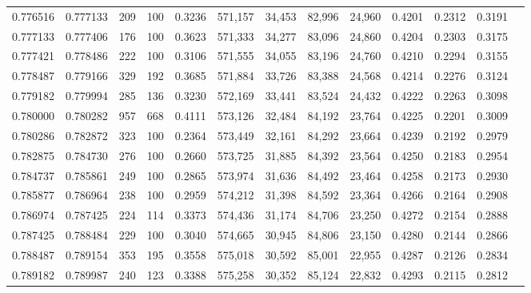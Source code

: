 \begin{tabular}{rrrrrrrrrrrrr}
0.776516 & 0.777133 &   209 & 100 &                                     0.3236 & 571,157 &  34,453 &  82,996 &  24,960 & 0.4201 & 0.2312 & 0.3191 \\
0.777133 & 0.777406 &   176 & 100 &                                     0.3623 & 571,333 &  34,277 &  83,096 &  24,860 & 0.4204 & 0.2303 & 0.3175 \\
0.777421 & 0.778486 &   222 & 100 &                                     0.3106 & 571,555 &  34,055 &  83,196 &  24,760 & 0.4210 & 0.2294 & 0.3155 \\
0.778487 & 0.779166 &   329 & 192 &                                     0.3685 & 571,884 &  33,726 &  83,388 &  24,568 & 0.4214 & 0.2276 & 0.3124 \\
0.779182 & 0.779994 &   285 & 136 &                                     0.3230 & 572,169 &  33,441 &  83,524 &  24,432 & 0.4222 & 0.2263 & 0.3098 \\
0.780000 & 0.780282 &   957 & 668 &                                     0.4111 & 573,126 &  32,484 &  84,192 &  23,764 & 0.4225 & 0.2201 & 0.3009 \\
0.780286 & 0.782872 &   323 & 100 &                                     0.2364 & 573,449 &  32,161 &  84,292 &  23,664 & 0.4239 & 0.2192 & 0.2979 \\
0.782875 & 0.784730 &   276 & 100 &                                     0.2660 & 573,725 &  31,885 &  84,392 &  23,564 & 0.4250 & 0.2183 & 0.2954 \\
0.784737 & 0.785861 &   249 & 100 &                                     0.2865 & 573,974 &  31,636 &  84,492 &  23,464 & 0.4258 & 0.2173 & 0.2930 \\
0.785877 & 0.786964 &   238 & 100 &                                     0.2959 & 574,212 &  31,398 &  84,592 &  23,364 & 0.4266 & 0.2164 & 0.2908 \\
0.786974 & 0.787425 &   224 & 114 &                                     0.3373 & 574,436 &  31,174 &  84,706 &  23,250 & 0.4272 & 0.2154 & 0.2888 \\
0.787425 & 0.788484 &   229 & 100 &                                     0.3040 & 574,665 &  30,945 &  84,806 &  23,150 & 0.4280 & 0.2144 & 0.2866 \\
0.788487 & 0.789154 &   353 & 195 &                                     0.3558 & 575,018 &  30,592 &  85,001 &  22,955 & 0.4287 & 0.2126 & 0.2834 \\
0.789182 & 0.789987 &   240 & 123 &                                     0.3388 & 575,258 &  30,352 &  85,124 &  22,832 & 0.4293 & 0.2115 & 0.2812 \\

\end{tabular}
